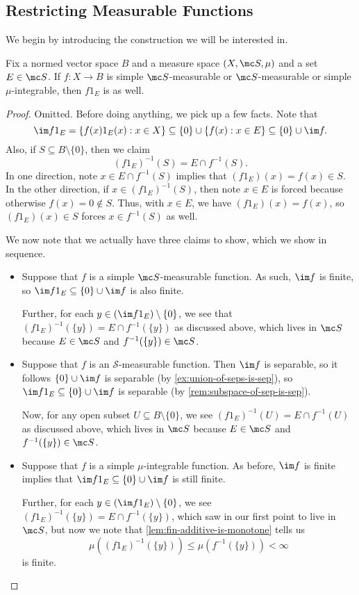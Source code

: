 \documentclass[../notes.tex]{subfiles}
\begin{document}
\subsection{Restricting Measurable Functions}
We begin by introducing the construction we will be interested in.
\begin{lemma} \label{lem:restrict-meas-functions}
	Fix a normed vector space $B$ and a measure space $(X,\mc S,\mu)$ and a set $E\in\mc S$. If $f\colon X\to B$ is simple $\mc S$-measurable or $\mc S$-measurable or simple $\mu$-integrable, then $f1_E$ is as well.
\end{lemma}
\begin{proof}
	Omitted.
	Before doing anything, we pick up a few facts. Note that
	\[\im f1_E=\{f(x)1_E(x):x\in X\}\subseteq\{0\}\cup\{f(x):x\in E\}\subseteq\{0\}\cup\im f.\]
	Also, if $S\subseteq B\setminus\{0\}$, then we claim
	\[(f1_E)^{-1}(S)=E\cap f^{-1}(S).\]
	In one direction, note $x\in E\cap f^{-1}(S)$ implies that $(f1_E)(x)=f(x)\in S$. In the other direction, if $x\in(f1_E)^{-1}(S)$, then note $x\in E$ is forced because otherwise $f(x)=0\notin S$. Thus, with $x\in E$, we have $(f1_E)(x)=f(x)$, so $(f1_E)(x)\in S$ forces $x\in f^{-1}(S)$ as well.

	We now note that we actually have three claims to show, which we show in sequence.
	\begin{itemize}
		\item Suppose that $f$ is a simple $\mc S$-measurable function. As such, $\im f$ is finite, so $\im f1_E\subseteq\{0\}\cup\im f$ is also finite.
		
		Further, for each $y\in(\im f1_E)\setminus\{0\}$, we see that $(f1_E)^{-1}(\{y\})=E\cap f^{-1}(\{y\})$ as discussed above, which lives in $\mc S$ because $E\in\mc S$ and $f^{-1}(\{y\})\in\mc S$.
		\item Suppose that $f$ is an $\mathcal S$-measurable function. Then $\im f$ is separable, so it follows $\{0\}\cup\im f$ is separable (by \autoref{ex:union-of-seps-is-sep}), so $\im f1_E\subseteq\{0\}\cup\im f$ is separable (by \autoref{rem:subspace-of-sep-is-sep}).

		Now, for any open subset $U\subseteq B\setminus\{0\}$, we see $(f1_E)^{-1}(U)=E\cap f^{-1}(U)$ as discussed above, which lives in $\mc S$ because $E\in\mc S$ and $f^{-1}(\{y\})\in\mc S$.
		\item Suppose that $f$ is a simple $\mu$-integrable function. As before, $\im f$ is finite implies that $\im f1_E\subseteq\{0\}\cup\im f$ is still finite.

		Further, for each $y\in(\im f1_E)\setminus\{0\}$, we see $(f1_E)^{-1}(\{y\})=E\cap f^{-1}(\{y\})$, which saw in our first point to live in $\mc S$, but now we note that \autoref{lem:fin-additive-is-monotone} tells us
		\[\mu\left((f1_E)^{-1}(\{y\})\right)\le\mu\left(f^{-1}(\{y\})\right)<\infty\]
		is finite.
		\qedhere
	\end{itemize}
\end{proof}
\end{document}

